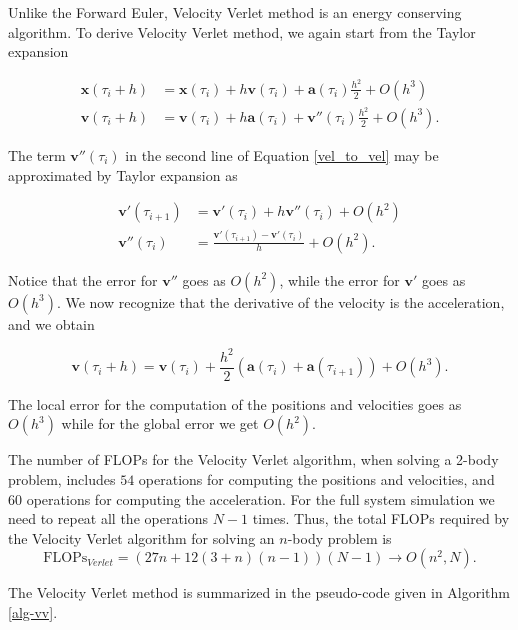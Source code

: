 \documentclass[a4paper]{article}
\begin{document}
Unlike the Forward Euler, Velocity Verlet method is an energy conserving algorithm. To derive Velocity Verlet method, we again start from the Taylor expansion 

\begin{align}
\mathbf{x}(\tau_i + h) &= \mathbf{x}(\tau_i) + h\mathbf{v}(\tau_i) + \mathbf{a}(\tau_i)\frac{h^{2}}{2} + O(h^{3}) \nonumber \\
\mathbf{v}(\tau_i + h) &= \mathbf{v}(\tau_i) + h\mathbf{a}(\tau_i) + \mathbf{v}''(\tau_i)\frac{h^{2}}{2} + O(h^{3}).
\label{vel_to_vel}
\end{align}

The term $\mathbf{v}''(\tau_i)$ in the second line of Equation \ref{vel_to_vel} may be approximated by Taylor expansion as

\begin{align}
\mathbf{v}'(\tau_{i+1}) &= \mathbf{v}'(\tau_{i}) + h\mathbf{v}''(\tau_i) + O(h^{2}) \nonumber \\
\mathbf{v}''(\tau_i) &= \frac{\mathbf{v}'(\tau_{i+1}) - \mathbf{v}'(\tau_i)}{h} + O(h^{2}).
\end{align}

Notice that the error for $\mathbf{v}''$ goes as $O(h^2)$, while the error for $\mathbf{v}'$ goes as $O(h^3)$. We now recognize that the derivative of the velocity is the acceleration, and we obtain

\begin{equation}
\mathbf{v}(\tau_i + h) = \mathbf{v}(\tau_i) + \frac{h^{2}}{2}(\mathbf{a}(\tau_i) + \mathbf{a}(\tau_{i+1})) + O(h^{3}).
\end{equation}

The local error for the computation of the positions and velocities goes as $O(h^3)$ while for the global error we get $O(h^2)$. 


The number of FLOPs for the Velocity Verlet algorithm, when solving a 2-body problem, includes $54$ operations for computing the positions and velocities, and 60 operations  for computing the acceleration. For the full system simulation we need to repeat all the operations $N-1$ times. Thus, the total FLOPs required by the Velocity Verlet algorithm for solving an $n$-body problem is
\begin{equation}
	\text{FLOPs}_{Verlet}=(27n + 12(3 + n)(n - 1))(N-1) \rightarrow O(n^2, N)  \label{flops_verlet}.
\end{equation}

The Velocity Verlet method is summarized in the pseudo-code given in Algorithm \ref{alg-vv}.
\end{document}

